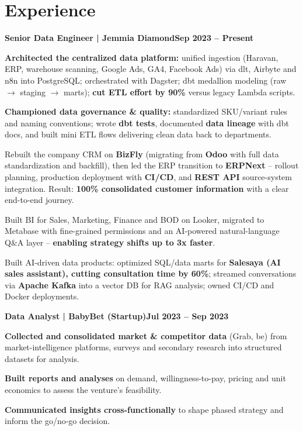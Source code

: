 \documentclass[letterpaper,10pt]{article}
\newcommand{\heading}[2]{
  \hspace{10pt}#1\hfill#2\\
}
\newcommand{\headingBf}[2]{
  \heading{\textbf{#1}}{\textbf{#2}}
}
\newenvironment{resume_list}{
  \vspace{-2pt}
  \begin{itemize}[topsep=2pt, itemsep=1pt, parsep=0pt, leftmargin=30pt, label=\textbullet]
}{
  \end{itemize}
}
\begin{document}

\section{Experience}

\headingBf{Senior Data Engineer | Jemmia Diamond}{Sep 2023 -- Present}
\vspace{1pt}
\begin{resume_list}
  \item \textbf{Architected the centralized data platform:} unified ingestion (Haravan, ERP, warehouse scanning, Google Ads, GA4, Facebook Ads) via dlt, Airbyte and n8n into PostgreSQL; orchestrated with Dagster; dbt medallion modeling (raw $\rightarrow$ staging $\rightarrow$ marts); \textbf{cut ETL effort by 90\%} versus legacy Lambda scripts.
  \item \textbf{Championed data governance \& quality:} standardized SKU/variant rules and naming conventions; wrote \textbf{dbt tests}, documented \textbf{data lineage} with dbt docs, and built mini ETL flows delivering clean data back to departments.
  \item Rebuilt the company CRM on \textbf{BizFly} (migrating from \textbf{Odoo} with full data standardization and backfill), then led the ERP transition to \textbf{ERPNext} -- rollout planning, production deployment with \textbf{CI/CD}, and \textbf{REST API} source-system integration. Result: \textbf{100\% consolidated customer information} with a clear end-to-end journey.
  \item Built BI for Sales, Marketing, Finance and BOD on Looker, migrated to Metabase with fine-grained permissions and an AI-powered natural-language Q\&A layer -- \textbf{enabling strategy shifts up to 3x faster}.
  \item Built AI-driven data products: optimized SQL/data marts for \textbf{Salesaya (AI sales assistant), cutting consultation time by 60\%}; streamed conversations via \textbf{Apache Kafka} into a vector DB for RAG analysis; owned CI/CD and Docker deployments.
\end{resume_list}

\vspace{6pt}

\headingBf{Data Analyst | BabyBet (Startup)}{Jul 2023 -- Sep 2023}
\vspace{1pt}
\begin{resume_list}
  \item \textbf{Collected and consolidated market \& competitor data} (Grab, be) from market-intelligence platforms, surveys and secondary research into structured datasets for analysis.
  \item \textbf{Built reports and analyses} on demand, willingness-to-pay, pricing and unit economics to assess the venture's feasibility.
  \item \textbf{Communicated insights cross-functionally} to shape phased strategy and inform the go/no-go decision.
\end{resume_list}
\end{document}
